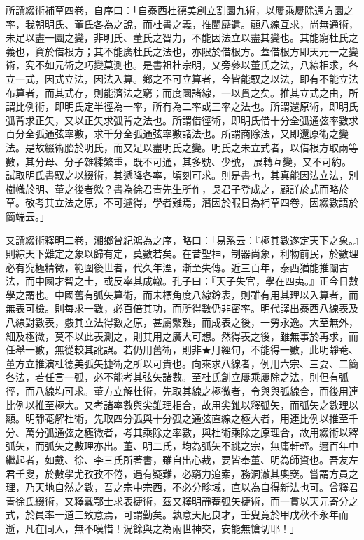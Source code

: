 \begin{pinyinscope}
所譔綴術補草四卷，自序曰：「自泰西杜德美創立割圜九術，以屢乘屢除通方圜之率，我朝明氏、董氏各為之說，而杜書之義，推闡靡遺。顧八線互求，尚無通術，未足以盡一圜之變，非明氏、董氏之智力，不能因法立以盡其變也。其能窮杜氏之義也，資於借根方；其不能廣杜氏之法也，亦限於借根方。蓋借根方即天元一之變術，究不如元術之巧變莫測也。是書祖杜宗明，又旁參以董氏之法，八線相求，各立一式，因式立法，因法入算。鄉之不可立算者，今皆能馭之以法，即有不能立法布算者，而其式存，則能濟法之窮；而度圜諸線，一以貫之矣。推其立式之由，所謂比例術，即明氏定半徑為一率，所有為二率或三率之法也。所謂還原術，即明氏弧背求正矢，又以正矢求弧背之法也。所謂借徑術，即明氏借十分全弧通弦率數求百分全弧通弦率數，求千分全弧通弦率數諸法也。所謂商除法，又即還原術之變法。是故綴術胎於明氏，而又足以盡明氏之變。明氏之未立式者，以借根方取兩等數，其分母、分子雜糅繁重，既不可通，其多號、少號，展轉互變，又不可約。試取明氏書馭之以綴術，其遞降各率，頃刻可求。則是書也，其真能因法立法，別樹幟於明、董之後者歟？書為徐君青先生所作，吳君子登成之，顧詳於式而略於草。敬考其立法之原，不可遽得，學者難焉，潛因於暇日為補草四卷，因綴數語於簡端云。」

又譔綴術釋明二卷，湘鄉曾紀鴻為之序，略曰：「易系云：『極其數遂定天下之象。』則綜天下難定之象以歸有定，莫數若矣。在昔聖神，制器尚象，利物前民，於數理必有究極精微，範圍後世者，代久年湮，漸至失傳。近三百年，泰西猶能推闡古法，而中國才智之士，或反率其成轍。孔子曰：『天子失官，學在四夷。』正今日數學之謂也。中國舊有弧矢算術，而未標角度八線鈐表，則雖有用其理以入算者，而無表可檢。則每求一數，必百倍其功，而所得數仍非密率。明代譯出泰西八線表及八線對數表，覈其立法得數之原，甚屬繁難，而成表之後，一勞永逸。大至無外，細及極微，莫不以此表測之，則其用之廣大可想。然得表之後，雖無事於再求，而任舉一數，無從較其訛誤。若仍用舊術，則非★月經旬，不能得一數，此明靜菴、董方立推演杜德美弧矢捷術之所以可貴也。向來求八線者，例用六宗、三耍、二簡各法，若任言一弧，必不能考其弦矢諸數。至杜氏創立屢乘屢除之法，則但有弧徑，而八線均可求。董方立解杜術，先取其線之極微者，令與與弧線合，而後用連比例以推至極大。又考諸率數與尖錐理相合，故用尖錐以釋弧矢，而弧矢之數理以顯。明靜菴解杜術，先取四分弧與十分弧之通弦直線之極大者，用連比例以推至千分、萬分弧通弦之極微者，考其乘除之率數，與杜術乘除之原理合，故用綴術以釋弧矢，而弧矢之數理亦出。董、明二氏，均為弧矢不祧之宗，無庸軒輊。邇百年中繼起者，如戴、徐、李三氏所著書，雖自出心裁，要皆奉董、明為師資也。吾友左君壬叟，於數學尤孜孜不倦，遇有疑難，必窮力追索，務洞澈其奧窔。嘗謂方員之理，乃天地自然之數，吾之宗中宗西，不必分畛域，直以為自得新法也可。曾釋君青徐氏綴術，又釋戴鄂士求表捷術，茲又釋明靜菴弧矢捷術，而一貫以天元寄分之式，於員率一道三致意焉，可謂勤矣。孰意天厄良才，壬叟竟於甲戌秋不永年而逝，凡在同人，無不嘆惜！況餘與之為兩世神交，安能無愴切耶！」


\end{pinyinscope}
